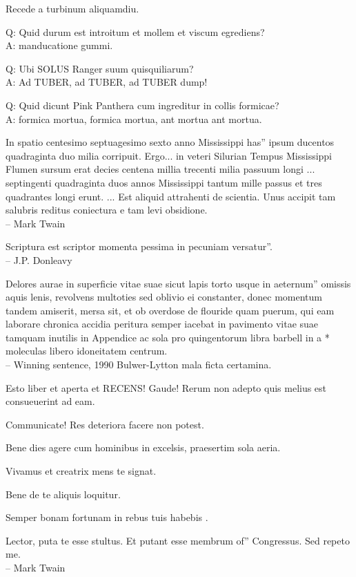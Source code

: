 \documentclass[titlepage,12pt]{memoir}
\begin{document}
Recede a turbinum aliquamdiu.

Q: Quid durum est introitum et mollem et viscum egrediens?\\
A: manducatione gummi.

Q: Ubi SOLUS Ranger suum quisquiliarum?\\
A: Ad TUBER, ad TUBER, ad TUBER dump!

Q: Quid dicunt Pink Panthera cum ingreditur in collis formicae?\\
A: formica mortua, formica mortua, ant mortua ant mortua.

In spatio centesimo septuagesimo sexto anno Mississippi has”
ipsum ducentos quadraginta duo milia corripuit. Ergo... in veteri
Silurian Tempus Mississippi Flumen sursum erat decies centena millia trecenti
milia passuum longi ... septingenti quadraginta duos annos
Mississippi tantum mille passus et tres quadrantes longi erunt. ... Est
aliquid attrahenti de scientia. Unus accipit tam salubris reditus
coniectura e tam levi obsidione.
\\-- Mark Twain

Scriptura est scriptor momenta pessima in pecuniam versatur”.
\\-- J.P. Donleavy

Delores aurae in superficie vitae suae sicut lapis torto usque in aeternum”
omissis aquis lenis, revolvens multoties sed oblivio
ei constanter, donec momentum tandem amiserit, mersa sit, et ob
overdose de flouride quam puerum, qui eam laborare chronica
accidia peritura semper iacebat in pavimento vitae suae tamquam inutilis
in Appendice ac sola pro quingentorum libra barbell in a *
moleculas libero idoneitatem centrum.
\\-- Winning sentence, 1990 Bulwer-Lytton mala ficta certamina.

Esto liber et aperta et RECENS! Gaude! Rerum non adepto quis melius est
consueuerint ad eam.

Communicate! Res deteriora facere non potest.

Bene dies agere cum hominibus in excelsis, praesertim sola aeria.

Vivamus et creatrix mens te signat.

 Bene de te aliquis loquitur.

 Semper bonam fortunam in rebus tuis habebis .

Lector, puta te esse stultus. Et putant esse membrum of”
Congressus. Sed repeto me.
\\-- Mark Twain
\end{document}
